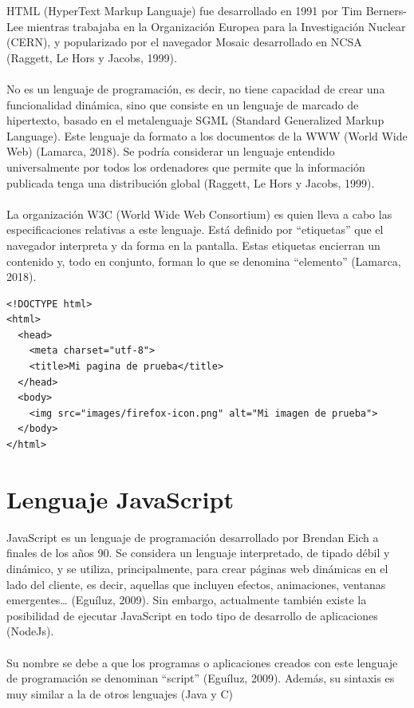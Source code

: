 \documentclass{report}
\begin{document}
HTML (HyperText Markup Languaje) fue desarrollado en 1991 por Tim Berners-Lee mientras trabajaba en la Organización Europea para la Investigación Nuclear (CERN), y popularizado por el navegador Mosaic desarrollado en NCSA (Raggett, Le Hors y Jacobs, 1999).
\\
\\
No es un lenguaje de programación, es decir, no tiene capacidad de crear una funcionalidad dinámica, sino que consiste en un lenguaje de marcado de hipertexto, basado en el metalenguaje SGML (Standard Generalized Markup Language). Este lenguaje da formato a los documentos de la WWW (World Wide Web) (Lamarca, 2018). Se podría considerar un lenguaje entendido universalmente por todos los ordenadores que permite que la información publicada tenga una distribución global (Raggett, Le Hors y Jacobs, 1999).
\\
\\
La organización W3C (World Wide Web Consortium) es quien lleva a cabo las especificaciones relativas a este lenguaje. Está definido por “etiquetas” que el navegador interpreta y da forma en la pantalla. Estas etiquetas encierran un contenido y, todo en conjunto, forman lo que se denomina “elemento” (Lamarca, 2018).
\\
\begin{lstlisting}[frame=single,breaklines=true, label=Ejemplo de código HTML, caption=Ejemplo de código HTML, captionpos=b]
<!DOCTYPE html>
<html>
  <head>
    <meta charset="utf-8">
    <title>Mi pagina de prueba</title>
  </head>
  <body>
    <img src="images/firefox-icon.png" alt="Mi imagen de prueba">
  </body>
</html>

\end{lstlisting}

\section{Lenguaje JavaScript}

JavaScript es un lenguaje de programación desarrollado por Brendan Eich a finales de los años 90. Se considera un lenguaje interpretado, de tipado débil y dinámico, y se utiliza, principalmente, para crear páginas web dinámicas en el lado del cliente, es decir, aquellas que incluyen efectos, animaciones, ventanas emergentes… (Eguíluz, 2009). Sin embargo, actualmente también existe la posibilidad de ejecutar JavaScript en todo tipo de desarrollo de aplicaciones (NodeJs).
\\
\\
Su nombre se debe a que los programas o aplicaciones creados con este lenguaje de programación se denominan “script” (Eguíluz, 2009). Además, su sintaxis es muy similar a la de otros lenguajes (Java y C)
\end{document}
